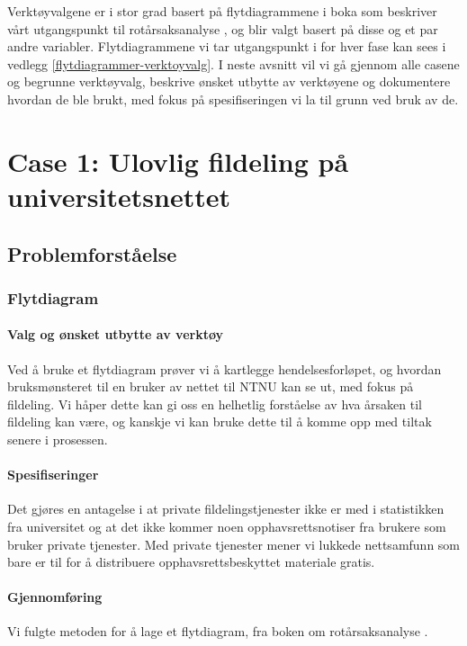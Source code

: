 Verktøyvalgene er i stor grad basert på flytdiagrammene i boka som beskriver vårt utgangspunkt til rotårsaksanalyse \cite{RCA}, og blir valgt basert på disse og et par andre variabler. Flytdiagrammene vi tar utgangspunkt i for hver fase kan sees i vedlegg \ref{flytdiagrammer-verktoyvalg}. I neste avsnitt vil vi gå gjennom alle casene og begrunne verktøyvalg, beskrive ønsket utbytte av verktøyene og dokumentere hvordan de ble brukt, med fokus på spesifiseringen vi la til grunn ved bruk av de. 

\section{Case 1: Ulovlig fildeling på universitetsnettet}

\subsection{Problemforståelse}

\subsubsection{Flytdiagram}

\paragraph{Valg og ønsket utbytte av verktøy}
Ved å bruke et flytdiagram prøver vi å kartlegge hendelsesforløpet, og hvordan bruksmønsteret til en bruker av nettet til NTNU kan se ut, med fokus på fildeling. Vi håper dette kan gi oss en helhetlig forståelse av hva årsaken til fildeling kan være, og kanskje vi kan bruke dette til å komme opp med tiltak senere i prosessen. 

\paragraph{Spesifiseringer}
Det gjøres en antagelse i at private fildelingstjenester ikke er med i statistikken fra universitet og at det ikke kommer noen opphavsrettsnotiser fra brukere som bruker private tjenester. Med private tjenester mener vi lukkede nettsamfunn som bare er til for å distribuere opphavsrettsbeskyttet materiale gratis.

\paragraph{Gjennomføring}
Vi fulgte metoden for å lage et flytdiagram, fra boken om rotårsaksanalyse \cite{RCA}.

